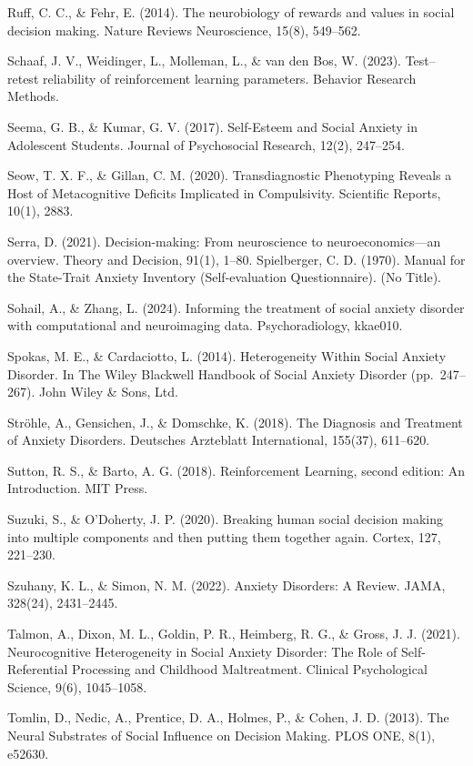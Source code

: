 \documentclass[12pt,a4paper,oneside,]{book} %
\begin{document}
Ruff, C. C., \& Fehr, E. (2014). The neurobiology of rewards and values in social decision making. Nature Reviews Neuroscience, 15(8), 549--562.

Schaaf, J. V., Weidinger, L., Molleman, L., \& van den Bos, W. (2023). Test--retest reliability of reinforcement learning parameters. Behavior Research Methods.

Seema, G. B., \& Kumar, G. V. (2017). Self-Esteem and Social Anxiety in Adolescent Students. Journal of Psychosocial Research, 12(2), 247--254.

Seow, T. X. F., \& Gillan, C. M. (2020). Transdiagnostic Phenotyping Reveals a Host of Metacognitive Deficits Implicated in Compulsivity. Scientific Reports, 10(1), 2883.

Serra, D. (2021). Decision-making: From neuroscience to neuroeconomics---an overview. Theory and Decision, 91(1), 1--80.
Spielberger, C. D. (1970). Manual for the State-Trait Anxiety Inventory (Self-evaluation Questionnaire). (No Title).

Sohail, A., \& Zhang, L. (2024). Informing the treatment of social anxiety disorder with computational and neuroimaging data. Psychoradiology, kkae010.

Spokas, M. E., \& Cardaciotto, L. (2014). Heterogeneity Within Social Anxiety Disorder. In The Wiley Blackwell Handbook of Social Anxiety Disorder (pp.~247--267). John Wiley \& Sons, Ltd.

Ströhle, A., Gensichen, J., \& Domschke, K. (2018). The Diagnosis and Treatment of Anxiety Disorders. Deutsches Arzteblatt International, 155(37), 611--620.

Sutton, R. S., \& Barto, A. G. (2018). Reinforcement Learning, second edition: An Introduction. MIT Press.

Suzuki, S., \& O'Doherty, J. P. (2020). Breaking human social decision making into multiple components and then putting them together again. Cortex, 127, 221--230.

Szuhany, K. L., \& Simon, N. M. (2022). Anxiety Disorders: A Review. JAMA, 328(24), 2431--2445.

Talmon, A., Dixon, M. L., Goldin, P. R., Heimberg, R. G., \& Gross, J. J. (2021). Neurocognitive Heterogeneity in Social Anxiety Disorder: The Role of Self-Referential Processing and Childhood Maltreatment. Clinical Psychological Science, 9(6), 1045--1058.

Tomlin, D., Nedic, A., Prentice, D. A., Holmes, P., \& Cohen, J. D. (2013). The Neural Substrates of Social Influence on Decision Making. PLOS ONE, 8(1), e52630.
\end{document}
